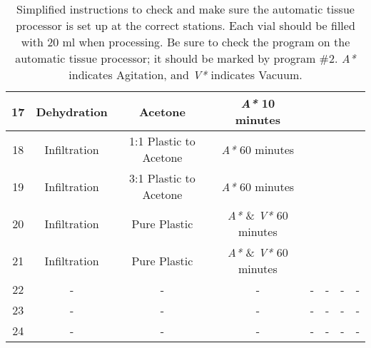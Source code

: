 \begin{table}
\begin{tabular}{|c|c|c|c|c|c|c|c|}
		17 &Dehydration & Acetone & \emph{A*} 10 minutes & & & &\\ \hline \hline
		18 &Infiltration & 1:1 Plastic to Acetone & \emph{A*} 60 minutes & & & &\\ \hline 
		19 &Infiltration & 3:1 Plastic to Acetone & \emph{A*} 60 minutes & & & &\\ \hline 
		20 &Infiltration & Pure Plastic & \emph{A*} \& \emph{V*} 60 minutes & & & &\\ \hline 
		21 &Infiltration & Pure Plastic & \emph{A*} \& \emph{V*} 60 minutes & & & &\\ \hline 
		22 & - & - & - & - & - & - & -\\ \hline 
		23 & - & - & - & - & - & - & -\\ \hline
		24 & - & - & - & - & - & - & -\\ \hline
	\end{tabular}
	\caption{Simplified instructions to check and make sure the automatic tissue processor is set up at the correct stations.  Each vial should be filled with 20 ml when processing.  Be sure to check the program on the automatic tissue processor; it should be marked by program \#2.  \emph{A*} indicates Agitation, and \emph{V*} indicates Vacuum.}
\end{table}